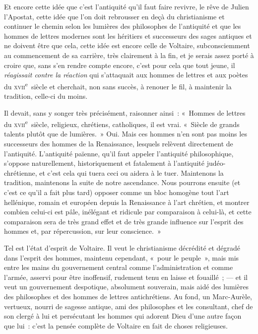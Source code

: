 \documentclass[french,twoside]{book} %
\begin{document}
Et encore cette idée que c’est l’antiquité qu’il faut faire revivre, le rêve de Julien l’Apostat, cette idée que l’on doit rebrousser en deçà du christianisme et continuer le chemin selon les lumières des philosophes de l’antiquité et que les hommes de lettres modernes sont les héritiers et successeurs des sages antiques et ne doivent être que  cela, cette idée est encore celle de Voltaire, subconsciemment au commencement de sa carrière, très clairement à la fin, et je serais assez porté à croire que, sans s’en rendre compte encore, c’est pour cela que tout jeune, il {\itshape réagissait contre la réaction} qui s’attaquait aux hommes de lettres et aux poètes du \textsc{xvii}\textsuperscript{e} siècle et cherchait, non sans succès, à renouer le fil, à maintenir la tradition, celle-ci du moins.\par
Il devait, sans y songer très précisément, raisonner ainsi : « Hommes de lettres du \textsc{xvii}\textsuperscript{e} siècle, religieux, chrétiens, catholiques, il est vrai. « Siècle de grands talents plutôt que de lumières. » Oui. Mais ces hommes n’en sont pas moins les successeurs des hommes de la Renaissance, lesquels relèvent directement de l’antiquité. L’antiquité païenne, qu’il faut appeler l’antiquité philosophique, s’oppose naturellement, historiquement et fatalement à l’antiquité judéo-chrétienne, et c’est cela qui tuera ceci ou aidera à le tuer. Maintenons la tradition, maintenons la suite de notre ascendance. Nous pourrons ensuite (et c’est ce qu’il a fait plus tard) opposer comme un bloc homogène tout l’art hellénique, romain et européen depuis la Renaissance à l’art chrétien, et montrer combien celui-ci est pâle, inélégant et ridicule par comparaison à celui-là, et cette comparaison  sera de très grand effet et de très grande influence sur l’esprit des hommes et, par répercussion, sur leur conscience. »\par
Tel est l’état d’esprit de Voltaire. Il veut le christianisme décrédité et dégradé dans l’esprit des hommes, maintenu cependant, « pour le peuple », mais mis entre les mains du gouvernement central comme l’administration et comme l’armée, asservi pour être inoffensif, rudement tenu en laisse et fouaillé ; — et il veut un gouvernement despotique, absolument souverain, mais aidé des lumières des philosophes et des hommes de lettres antichrétiens. Au fond, un Marc-Aurèle, vertueux, nourri de sagesse antique, ami des philosophes et les consultant, chef de son clergé à lui et persécutant les hommes qui adorent Dieu d’une autre façon que lui : c’est la pensée complète de Voltaire en fait de choses religieuses.\par
\end{document}
